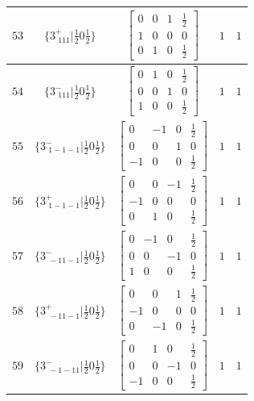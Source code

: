 \documentclass[fleqn,8pt]{jsarticle}
\begin{document}
\begin{longtable}{ccccc}
$ 53 $ & $ \{3^{+}_{\,\,111}|\frac{1}{2} 0 \frac{1}{2}\} $ & $ \begin{bmatrix} 0 & 0 & 1 & \frac{1}{2} \\ 1 & 0 & 0 & 0 \\ 0 & 1 & 0 & \frac{1}{2} \end{bmatrix} $ & $ 1 $ & $ 1 $ \\ \hline
$ 54 $ & $ \{3^{-}_{\,\,111}|\frac{1}{2} 0 \frac{1}{2}\} $ & $ \begin{bmatrix} 0 & 1 & 0 & \frac{1}{2} \\ 0 & 0 & 1 & 0 \\ 1 & 0 & 0 & \frac{1}{2} \end{bmatrix} $ & $ 1 $ & $ 1 $ \\ \hline
$ 55 $ & $ \{3^{-}_{\,\,1-1-1}|\frac{1}{2} 0 \frac{1}{2}\} $ & $ \begin{bmatrix} 0 & -1 & 0 & \frac{1}{2} \\ 0 & 0 & 1 & 0 \\ -1 & 0 & 0 & \frac{1}{2} \end{bmatrix} $ & $ 1 $ & $ 1 $ \\ \hline
$ 56 $ & $ \{3^{+}_{\,\,1-1-1}|\frac{1}{2} 0 \frac{1}{2}\} $ & $ \begin{bmatrix} 0 & 0 & -1 & \frac{1}{2} \\ -1 & 0 & 0 & 0 \\ 0 & 1 & 0 & \frac{1}{2} \end{bmatrix} $ & $ 1 $ & $ 1 $ \\ \hline
$ 57 $ & $ \{3^{-}_{\,\,-11-1}|\frac{1}{2} 0 \frac{1}{2}\} $ & $ \begin{bmatrix} 0 & -1 & 0 & \frac{1}{2} \\ 0 & 0 & -1 & 0 \\ 1 & 0 & 0 & \frac{1}{2} \end{bmatrix} $ & $ 1 $ & $ 1 $ \\ \hline
$ 58 $ & $ \{3^{+}_{\,\,-11-1}|\frac{1}{2} 0 \frac{1}{2}\} $ & $ \begin{bmatrix} 0 & 0 & 1 & \frac{1}{2} \\ -1 & 0 & 0 & 0 \\ 0 & -1 & 0 & \frac{1}{2} \end{bmatrix} $ & $ 1 $ & $ 1 $ \\ \hline
$ 59 $ & $ \{3^{-}_{\,\,-1-11}|\frac{1}{2} 0 \frac{1}{2}\} $ & $ \begin{bmatrix} 0 & 1 & 0 & \frac{1}{2} \\ 0 & 0 & -1 & 0 \\ -1 & 0 & 0 & \frac{1}{2} \end{bmatrix} $ & $ 1 $ & $ 1 $ \\ \hline

\end{longtable}
\end{document}
